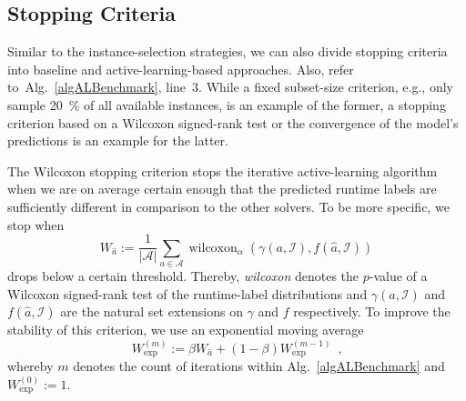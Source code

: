 \documentclass[runningheads]{llncs}
\begin{document}

\subsection{Stopping Criteria}
\label{sec:main3}
Similar to the instance-selection strategies, we can also divide stopping criteria into baseline and active-learning-based approaches.
Also, refer to~Alg.~\ref{algALBenchmark}, line~3.
While a fixed subset-size criterion, e.g., only sample \SI{20}{\%} of all available instances, is an example of the former, a stopping criterion based on a Wilcoxon signed-rank test or the convergence of the model's predictions is an example for the latter.

The Wilcoxon stopping criterion stops the iterative active-learning algorithm when we are on average certain enough that the predicted runtime labels are sufficiently different in comparison to the other solvers.
To be more specific, we stop when
\begin{equation}
  W_{\hat{a}} := \frac{1}{\left\lvert \mathcal{A} \right\rvert} \sum_{a \in \mathcal{A}} \operatorname{wilcoxon}_{\alpha}\!\left(\gamma\!\left(a, \mathcal{I}\right), f\!\left(\hat{a}, \mathcal{I}\right) \right)
\end{equation}
drops below a certain threshold.
Thereby, \emph{wilcoxon} denotes the $p$-value of a Wilcoxon signed-rank test of the runtime-label distributions and $\gamma\!\left(a, \mathcal{I}\right)$ and $f\!\left(\hat{a}, \mathcal{I}\right)$ are the natural set extensions on $\gamma$ and $f$ respectively.
To improve the stability of this criterion, we use an exponential moving average
\begin{equation}
  W_{\exp}^{\left(m\right)} := \beta W_{\hat{a}} + \left(1 - \beta\right) W_{\exp}^{\left(m - 1\right)} \enspace \textrm{,}
\end{equation}
whereby $m$ denotes the count of iterations within Alg.~\ref{algALBenchmark} and $W_{\exp}^{\left(0\right)} := 1$.
\end{document}
